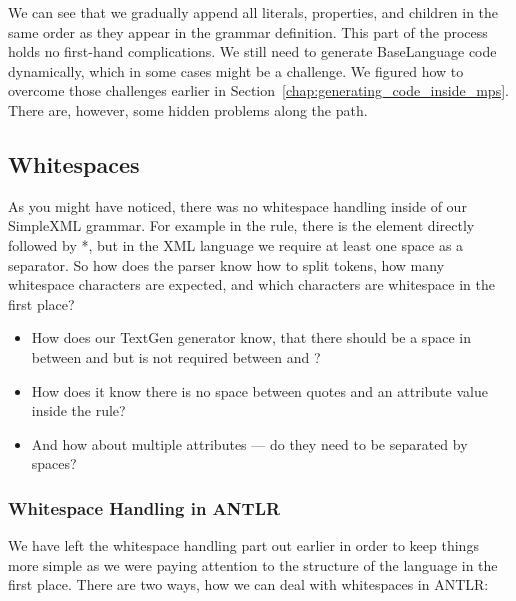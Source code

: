 We can see that we gradually append all literals, properties, and children in the same order as they appear in the grammar definition.
This part of the process holds no first-hand complications.
We still need to generate BaseLanguage code dynamically, which in some cases might be a challenge.
We figured how to overcome those challenges earlier in Section~\ref{chap:generating_code_inside_mps}.
There are, however, some hidden problems along the path.

\subsection{Whitespaces}
\label{chap:whitespaces}

As you might have noticed, there was no whitespace handling inside of our SimpleXML grammar.
For example in the  rule, there is  the element directly followed by *, but in the XML language we require at least one space as a separator.
So how does the parser know how to split tokens, how many whitespace characters are expected, and which characters are whitespace in the first place?

\begin{itemize}
	\item How does our TextGen generator know, that there should be a space in between  and  but is not required between \literal{\textless} and ?

	\item How does it know there is no space between quotes and an attribute value inside the  rule?

	\item And how about multiple attributes --- do they need to be separated by spaces?
\end{itemize}

\subsubsection{Whitespace Handling in ANTLR}

We have left the whitespace handling part out earlier in order to keep things more simple as we were paying attention to the structure of the language in the first place.
There are two ways, how we can deal with whitespaces in ANTLR:

